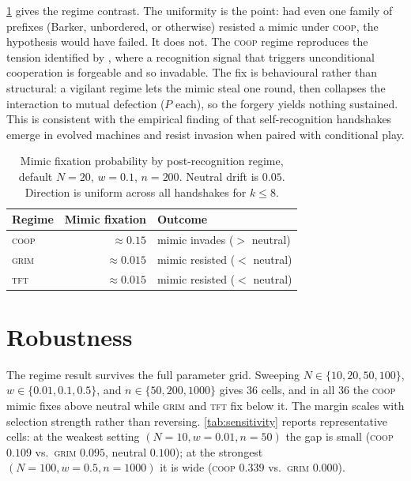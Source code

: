 \cref{tab:regime} gives the regime contrast. The uniformity is the point: had even one family
of prefixes (Barker, unbordered, or otherwise) resisted a mimic under \textsc{coop}, the
hypothesis would have failed. It does not. The \textsc{coop} regime reproduces the tension
identified by \citet{robson1990}, where a recognition signal that triggers unconditional
cooperation is forgeable and so invadable. The fix is behavioural rather than structural: a
vigilant regime lets the mimic steal one round, then collapses the interaction to mutual
defection ($P$ each), so the forgery yields nothing sustained. This is consistent with the
empirical finding of \citet{knight2018} that self-recognition handshakes emerge in evolved
machines and resist invasion when paired with conditional play.

\begin{table}[t]
  \centering
  \caption{Mimic fixation probability by post-recognition regime, default $N=20$, $w=0.1$,
  $n=200$. Neutral drift is $0.05$. Direction is uniform across all handshakes for $k\le 8$.}
  \label{tab:regime}
  \begin{tabular}{lrl}
    \toprule
    Regime & Mimic fixation & Outcome \\
    \midrule
    \textsc{coop} & $\approx 0.15$  & mimic invades ($>$ neutral) \\
    \textsc{grim} & $\approx 0.015$ & mimic resisted ($<$ neutral) \\
    \textsc{tft}  & $\approx 0.015$ & mimic resisted ($<$ neutral) \\
    \bottomrule
  \end{tabular}
\end{table}

\section{Robustness}\label{sec:robust}

The regime result survives the full parameter grid. Sweeping $N\in\{10,20,50,100\}$,
$w\in\{0.01,0.1,0.5\}$, and $n\in\{50,200,1000\}$ gives $36$ cells, and in all $36$ the
\textsc{coop} mimic fixes above neutral while \textsc{grim} and \textsc{tft} fix below it. The
margin scales with selection strength rather than reversing. \cref{tab:sensitivity} reports
representative cells: at the weakest setting $(N{=}10, w{=}0.01, n{=}50)$ the gap is small
(\textsc{coop} $0.109$ vs.\ \textsc{grim} $0.095$, neutral $0.100$); at the strongest
$(N{=}100, w{=}0.5, n{=}1000)$ it is wide (\textsc{coop} $0.339$ vs.\ \textsc{grim} $0.000$).

